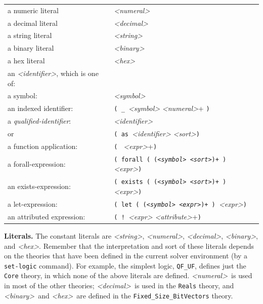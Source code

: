 \documentclass[12pt,oneside]{report}
\newcommand{\numeral}{{\it <numeral>}}
\newcommand{\decimal}{{\it <decimal>}}
\newcommand{\binary}{{\it <binary>}}
\newcommand{\hex}{{\it <hex>}}
\newcommand{\strng}{{\it <string>}} %
\begin{document}
\begin{tabular}{ll}
 a numeric literal & {\it <numeral>} \\
 a decimal literal & {\it <decimal>} \\
 a string literal & {\it <string>} \\
 a binary literal & {\it <binary>} \\
 a hex literal & {\it <hex>} \\
 an {\it <identifier>}, which is one of: &\\
\hspace{.25in}a symbol: & {\it <symbol>} \\
\hspace{.25in}an indexed identifier: & {\tt ( \_ }{\it <symbol>} {\it <numeral>}+ {\tt )} \\
a {\it qualified-identifier}:        &{\it <identifier>} \\
\hspace{.25in} or                    &{\tt ( as }{\it <identifier>} {\it <sort>}{\tt )} \\
a function application:              &{\tt ( }{\it <qualified-identifier> <expr>}+{\tt )} \\
a forall-expression:                 &{\tt ( forall ( ({\it <symbol>\ <sort>})+ ) }{\it <expr>}{\tt )} \\
an exists-expression:                &{\tt ( exists ( ({\it <symbol>\ <sort>})+ ) }{\it <expr>}{\tt )} \\
a let-expression:                    &{\tt ( let ( ({\it <symbol>\ <expr>})+ ) }{\it <expr>}{\tt )} \\
an attributed expression:            &{\tt ( ! }{\it <expr>} {\it <attribute>}+{\tt )} \\
\end{tabular}

{\bf Literals.}
The constant literals are \strng, \numeral, \decimal, \binary, and \hex. Remember that the interpretation and sort of these literals
depends on the theories that have been defined in the current solver environment (by a {\tt set-logic} command). For example,
the simplest logic, {\tt QF\_UF}, defines just the {\tt Core} theory, in which none of the above literals are defined. \numeral~is used in 
most of the other theories; \decimal~is used in the {\tt Reals} theory, and \binary~and \hex~are defined in the 
{\tt Fixed\_Size\_BitVectors} theory. 
\end{document}
